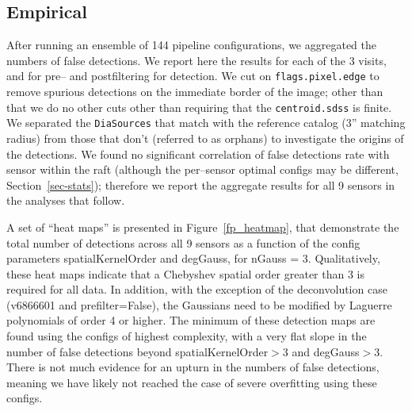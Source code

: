 \documentclass[prd, nofootinbib, floatfix, 11pt,tightenlines,times]{article}
\begin{document}
\subsection{Empirical}

After running an ensemble of 144 pipeline configurations, we
aggregated the numbers of false detections.  We report here the results for
each of the 3 visits, and for pre-- and postfiltering for
detection.  We cut on {\tt flags.pixel.edge} to remove spurious
detections on the immediate border of the image; other than that we do
no other cuts other than requiring that the {\tt centroid.sdss} is
finite.  We separated the {\tt DiaSources} that match with the reference
catalog (3'' matching radius) from those that don't (referred to as
orphans) to investigate the origins of the detections.  We found no
significant correlation of false detections rate with sensor within the
raft (although the per--sensor optimal configs may be different, Section~\ref{sec-stats}); 
therefore we report the aggregate results for all 9 sensors in
the analyses that follow.

A set of ``heat maps'' is presented in Figure~\ref{fp_heatmap}, that
demonstrate the total number of detections across all 9 sensors as a
function of the config parameters spatialKernelOrder and degGauss, for
nGauss = 3.  Qualitatively, these heat maps indicate that a Chebyshev
spatial order greater than 3 is required for all data.  In addition,
with the exception of the deconvolution case (v6866601 and
prefilter=False), the Gaussians need to be modified by Laguerre
polynomials of order 4 or higher.  The minimum of these detection maps
are found using the configs of highest complexity, with a very flat
slope in the number of false detections beyond spatialKernelOrder$>$3
and degGauss$>$3.  There is not much evidence for an upturn in the
numbers of false detections, meaning we have likely not reached the
case of severe overfitting using these configs.
\end{document}
